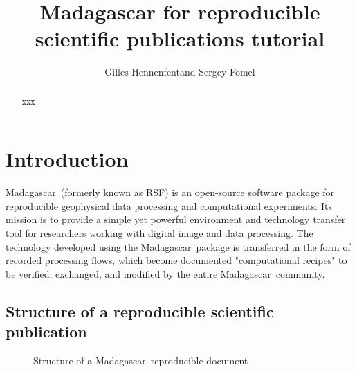 \author{Gilles Hennenfent\/\footnotemark[1] and Sergey Fomel\/\footnotemark[2]}
\title{Madagascar for reproducible scientific publications tutorial}


\newcommand{\rsf}{\textsf{Madagascar}\ }



\maketitle

\begin{abstract}
   xxx
\end{abstract}

\section{Introduction}

\rsf (formerly known as \textsf{RSF}) is an open-source software
package for reproducible geophysical data processing and computational
experiments. Its mission is to provide a simple yet powerful
environment and technology transfer tool for researchers working with
digital image and data processing. The technology developed using the
\rsf package is transferred in the form of recorded processing flows,
which become documented "computational recipes" to be verified,
exchanged, and modified by the entire \rsf community.

\subsection{Structure of a reproducible scientific publication}

\begin{figure}[h]
\begin{center}

\end{center}
\caption{Structure of a \rsf reproducible document}\label{fig:struct}
\end{figure}

